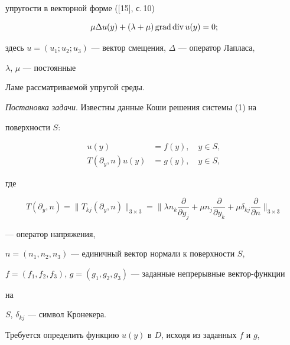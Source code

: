 упругости в векторной форме ([15], с.\,10) 


\begin{equation} 


\mu\Delta u(y)+(\lambda+\mu)\Grad\Div u(y)=0; 


\end{equation} 


здесь $u=(u_1;u_2;u_3)$ --- вектор смещения, $\Delta$ --- оператор Лапласа, 


$\lambda$, $\mu$ --- постоянные 


Ламе рассматриваемой упругой среды. 


\medskip 


 


{\it Постановка задачи}. Известны данные Коши решения системы (1) на 


поверхности $S$: 


\begin{equation} 


\begin{split} 


u(y)&=f(y),\quad y\in S,\\ 


T(\partial_y,n)u(y)&=g(y),\quad y\in S, 


\end{split} 


\end{equation} 


где 


$$ 


T(\partial_y,n)=\|T_{kj}(\partial_y,n)\|_{3\times 3}=\bigg\| 


\lambda n_k\frac{\partial}{\partial y_j}+\mu n_j 


\frac{\partial}{\partial y_k}+\mu\delta_{kj} 


\frac{\partial}{\partial n}\bigg\|_{3\times 3}


$$ 


--- оператор напряжения, 


$n=(n_1,n_2,n_3)$ --- единичный вектор нормали к поверхности $S$, 


$f=(f_1,f_2,f_3)$, $g=(g_1,g_2,g_3)$ --- заданные непрерывные вектор-функции 


на 


$S$, $\delta_{kj}$ --- символ Кронекера. 


 


Требуется определить функцию $u(y)$ в $D$, исходя из заданных $f$ и $g$, 


